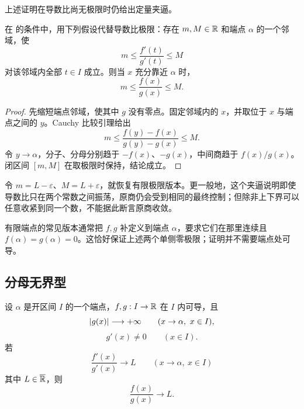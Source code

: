 上述证明在导数比尚无极限时仍给出定量夹逼。

\begin{corollary}[\(0/0\) 型的导数比夹逼]
\label{cor:lhopital-zero-zero-bracket}
在  的条件中，用下列假设代替导数比极限：存在 \(m,M\in\mathbb{R}\) 和端点 \(\alpha\) 的一个邻域，使
\[
 m\le\frac{f'(t)}{g'(t)}\le M
\]
对该邻域内全部 \(t\in I\) 成立。则当 \(x\) 充分靠近 \(\alpha\) 时，
\[
 m\le\frac{f(x)}{g(x)}\le M.
\]
\end{corollary}

\begin{proof}
先缩短端点邻域，使其中 \(g\) 没有零点。固定邻域内的 \(x\)，并取位于 \(x\) 与端点之间的 \(y\)。Cauchy 比较引理给出
\[
 m\le\frac{f(y)-f(x)}{g(y)-g(x)}\le M.
\]
令 \(y\to\alpha\)，分子、分母分别趋于 \(-f(x)\)、\(-g(x)\)，中间商趋于 \(f(x)/g(x)\)。闭区间 \([m,M]\) 在取极限时保持，结论成立。
\end{proof}

令 \(m=L-\varepsilon\)、\(M=L+\varepsilon\)，就恢复有限极限版本。更一般地，这个夹逼说明即使导数比只在两个常数之间振荡，原商仍会受到相同的最终控制；但除非上下界可以任意收紧到同一个数，不能据此断言原商收敛。

有限端点的常见版本通常把 \(f,g\) 补定义到端点 \(\alpha\)，要求它们在那里连续且 \(f(\alpha)=g(\alpha)=0\)。这恰好保证上述两个单侧零极限；证明并不需要端点处可导。

\subsection{分母无界型}

\begin{theorem}
\label{thm:lhopital-infinite-denominator}
设 \(\alpha\) 是开区间 \(I\) 的一个端点，\(f,g:I\to\mathbb{R}\) 在 \(I\) 内可导，且
\[
 \left|g(x)\right|\longrightarrow+\infty
 \qquad(x\to\alpha,\ x\in I),
\]
\[
 g'(x)\ne0\qquad(x\in I).
\]
若
\[
 \frac{f'(x)}{g'(x)}\longrightarrow L
 \qquad(x\to\alpha,\ x\in I)
\]
其中 \(L\in\overline{\mathbb{R}}\)，则
\[
 \frac{f(x)}{g(x)}\longrightarrow L.
\]
\end{theorem}


